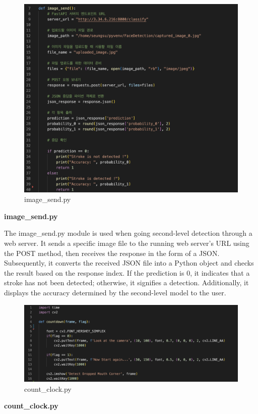 \begin{figure}[h]
    \centering
    \includegraphics[width=0.5\linewidth]{images/image_send.png}
    \caption{image\_send.py}
    \label{fig:enter-label}
\end{figure}

\textbf{image\_send.py}

The image\_send.py module is used when going second-level detection through a web server. It sends a specific image file to the running web server's URL using the POST method, then receives the response in the form of a JSON. Subsequently, it converts the received JSON file into a Python object and checks the result based on the response index. If the prediction is 0, it indicates that a stroke has not been detected; otherwise, it signifies a detection. Additionally, it displays the accuracy determined by the second-level model to the user.\\

\begin{figure}[h]
    \centering
    \includegraphics[width=0.5\linewidth]{images/count_clock.png}
    \caption{count\_clock.py}
    \label{fig:enter-label}
\end{figure}

\textbf{count\_clock.py}

